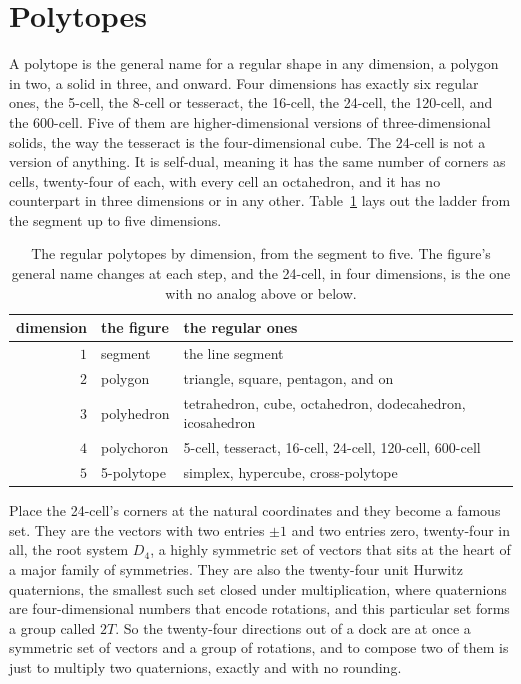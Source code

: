 \section{Polytopes}

A polytope is the general name for a regular shape in any dimension, a polygon in two, a solid in three, and onward. Four dimensions has exactly six regular ones, the 5-cell, the 8-cell or tesseract, the 16-cell, the 24-cell, the 120-cell, and the 600-cell. Five of them are higher-dimensional versions of three-dimensional solids, the way the tesseract is the four-dimensional cube. The 24-cell is not a version of anything. It is self-dual, meaning it has the same number of corners as cells, twenty-four of each, with every cell an octahedron, and it has no counterpart in three dimensions or in any other. Table~\ref{tab:polytopes} lays out the ladder from the segment up to five dimensions.

\begin{table}[ht]
\centering
\small
\begin{tabular}{@{}rll@{}}
\toprule
dimension & the figure & the regular ones \\
\midrule
$1$ & segment & the line segment \\
$2$ & polygon & triangle, square, pentagon, and on \\
$3$ & polyhedron & tetrahedron, cube, octahedron, dodecahedron, icosahedron \\
$4$ & polychoron & 5-cell, tesseract, 16-cell, 24-cell, 120-cell, 600-cell \\
$5$ & 5-polytope & simplex, hypercube, cross-polytope \\
\bottomrule
\end{tabular}
\caption{The regular polytopes by dimension, from the segment to five. The figure's general name changes at each step, and the 24-cell, in four dimensions, is the one with no analog above or below.}
\label{tab:polytopes}
\end{table}

Place the 24-cell's corners at the natural coordinates and they become a famous set. They are the vectors with two entries $\pm 1$ and two entries zero, twenty-four in all, the root system $D_4$, a highly symmetric set of vectors that sits at the heart of a major family of symmetries. They are also the twenty-four unit Hurwitz quaternions, the smallest such set closed under multiplication, where quaternions are four-dimensional numbers that encode rotations, and this particular set forms a group called $2T$. So the twenty-four directions out of a dock are at once a symmetric set of vectors and a group of rotations, and to compose two of them is just to multiply two quaternions, exactly and with no rounding.

